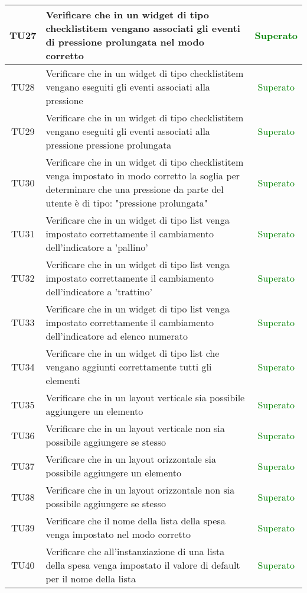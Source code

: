 \begin{center}
\begin{longtable}{|c|>{\centering}m{10cm}|c|}
		TU27 & Verificare che in un widget di tipo checklistitem vengano associati gli eventi di pressione prolungata nel modo corretto & \textcolor{Green}{Superato}\\ \hline
		TU28 & Verificare che in un widget di tipo checklistitem vengano eseguiti gli eventi associati alla pressione & \textcolor{Green}{Superato}\\ \hline
		TU29 & Verificare che in un widget di tipo checklistitem vengano eseguiti gli eventi associati alla pressione pressione prolungata & \textcolor{Green}{Superato}\\ \hline
		TU30 & Verificare che in un widget di tipo checklistitem venga impostato in modo corretto la soglia per determinare che una pressione da parte del utente è di tipo: "pressione prolungata" & \textcolor{Green}{Superato}\\ \hline
		TU31 & Verificare che in un widget di tipo list venga impostato correttamente il cambiamento dell'indicatore a 'pallino' & \textcolor{Green}{Superato}\\ \hline
		TU32 & Verificare che in un widget di tipo list venga impostato correttamente il cambiamento dell'indicatore a 'trattino' & \textcolor{Green}{Superato}\\ \hline
		TU33 & Verificare che in un widget di tipo list venga impostato correttamente il cambiamento dell'indicatore ad elenco numerato & \textcolor{Green}{Superato}\\ \hline
		TU34 & Verificare che in un widget di tipo list che vengano aggiunti correttamente tutti gli elementi & \textcolor{Green}{Superato}\\ \hline
		TU35 & Verificare che in un layout verticale sia possibile aggiungere un elemento & \textcolor{Green}{Superato}\\ \hline
		TU36 & Verificare che in un layout verticale non sia possibile aggiungere se stesso & \textcolor{Green}{Superato}\\ \hline
		TU37 & Verificare che in un layout orizzontale sia possibile aggiungere un elemento & \textcolor{Green}{Superato}\\ \hline
		TU38 & Verificare che in un layout orizzontale non sia possibile aggiungere se stesso & \textcolor{Green}{Superato}\\ \hline
		TU39 & Verificare che il nome della lista della spesa venga impostato nel modo corretto & \textcolor{Green}{Superato}\\ \hline
		TU40 & Verificare che all'instanziazione di una lista della spesa venga impostato il valore di default per il nome della lista & \textcolor{Green}{Superato}\\ \hline

\end{longtable}
\end{center}
